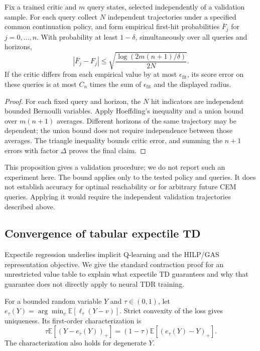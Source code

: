 \documentclass{article} %
\newcommand{\EE}{\mathbb E}
\theoremstyle{definition}
\theoremstyle{remark}
\begin{document}
\begin{proposition}
\label{prop:finite-audit}
Fix a trained critic and $m$ query states, selected independently of a validation
sample. For each query collect $N$ independent trajectories under a specified common
continuation policy, and form empirical first-hit probabilities $\bar F_j$ for
$j=0,\ldots,n$. With probability at least $1-\delta$, simultaneously over all queries
and horizons,
\[
 |\bar F_j-F_j|\le
 \sqrt{\frac{\log(2m(n+1)/\delta)}{2N}}.
\]
If the critic differs from each empirical value by at most $\epsilon_{\mathrm{fit}}$,
its score error on these queries is at most $C_n$ times the sum of
$\epsilon_{\mathrm{fit}}$ and the displayed radius.
\end{proposition}
\begin{proof}
For each fixed query and horizon, the $N$ hit indicators are independent bounded
Bernoulli variables. Apply Hoeffding's inequality \citep{hoeffding1963} and a union
bound over $m(n+1)$ averages. Different horizons of the same trajectory may be
dependent; the union bound does not require independence between those averages.
The triangle inequality bounds critic error, and summing the $n+1$ errors with
factor $\Delta$ proves the final claim.
\end{proof}
This proposition gives a validation procedure; we do not report such an experiment here.
The bound applies only to the tested policy and queries. It does not establish accuracy
for optimal reachability or for arbitrary future CEM queries.
Applying it would require the independent validation trajectories described above.

\subsection{Convergence of tabular expectile TD}
\label{app:expectile}
Expectile regression \citep{newey1987} underlies implicit Q-learning
\citep{iql} and the HILP/GAS representation objective.
We give the standard contraction proof for an unrestricted value table to explain
what expectile TD guarantees and why that guarantee does not directly apply to neural TDR training.

For a bounded random variable $Y$ and $\tau\in(0,1)$, let
$e_\tau(Y)=\arg\min_v\EE[\ell_\tau(Y-v)]$.
Strict convexity of the loss gives uniqueness.
Its first-order characterization is
\begin{equation}
 \tau\EE[(Y-e_\tau(Y))_+]
   =(1-\tau)\EE[(e_\tau(Y)-Y)_+].
 \label{eq:expectile-balance}
\end{equation}
The characterization also holds for degenerate $Y$.
\end{document}
